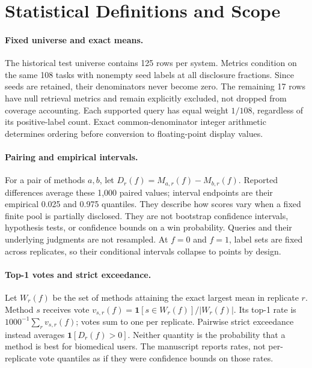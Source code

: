 \documentclass{article}
\newcommand{\ind}{\mathbf{1}}
\begin{document}



\appendix
\section{Statistical Definitions and Scope}
\label{app:stats}
\paragraph{Fixed universe and exact means.}
The historical test universe contains 125 rows per system. Metrics condition on the same 108 tasks with nonempty seed labels at all disclosure fractions. Since seeds are retained, their denominators never become zero. The remaining 17 rows have null retrieval metrics and remain explicitly excluded, not dropped from coverage accounting. Each supported query has equal weight $1/108$, regardless of its positive-label count. Exact common-denominator integer arithmetic determines ordering before conversion to floating-point display values.

\paragraph{Pairing and empirical intervals.}
For a pair of methods $a,b$, let $D_r(f)=M_{a,r}(f)-M_{b,r}(f)$. Reported differences average these 1,000 paired values; interval endpoints are their empirical 0.025 and 0.975 quantiles. They describe how scores vary when a fixed finite pool is partially disclosed. They are not bootstrap confidence intervals, hypothesis tests, or confidence bounds on a win probability. Queries and their underlying judgments are not resampled. At $f=0$ and $f=1$, label sets are fixed across replicates, so their conditional intervals collapse to points by design.

\paragraph{Top-1 votes and strict exceedance.}
Let $W_r(f)$ be the set of methods attaining the exact largest mean in replicate $r$. Method $s$ receives vote $v_{s,r}(f)=\ind[s\in W_r(f)]/|W_r(f)|$. Its top-1 rate is $1000^{-1}\sum_r v_{s,r}(f)$; votes sum to one per replicate. Pairwise strict exceedance instead averages $\ind[D_r(f)>0]$. Neither quantity is the probability that a method is best for biomedical users. The manuscript reports rates, not per-replicate vote quantiles as if they were confidence bounds on those rates.
\end{document}
